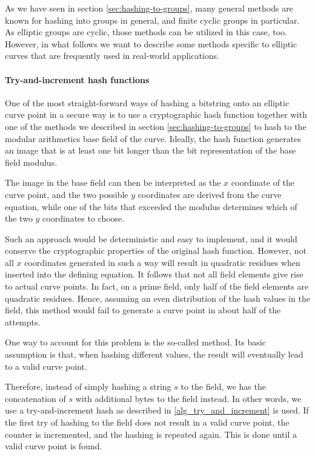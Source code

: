 As we have seen in section \ref{sec:hashing-to-groups}, many general methods are known for hashing into groups in general, and finite cyclic groups in particular. As elliptic groups are cyclic, those methods can be utilized in this case, too. However, in what follows we want to describe some methods specific to elliptic curves that are frequently used in real-world applications. 

\paragraph{Try-and-increment hash functions}
One of the most straight-forward ways of hashing a bitstring onto an elliptic curve point in a  secure way is to use a cryptographic hash function together with one of the methods we described in section \ref{sec:hashing-to-groups} to hash to the modular arithmetics base field of the curve. Ideally, the hash function generates an image that is at least one bit longer than the bit representation of the base field modulus.

The image in the base field can then be interpreted as the $x$ coordinate of the curve point, and the two possible $y$ coordinates are derived from the curve equation, while one of the bits that exceeded the modulus determines which of the two $y$ coordinates to choose.

Such an approach would be deterministic and easy to implement, and it would conserve the cryptographic properties of the original hash function. However, not all $x$ coordinates generated in such a way will result in quadratic residues when inserted into the defining equation. It follows that not all field elements give rise to actual curve points. In fact,
on a prime field, only half of the field elements are quadratic residues. Hence, assuming an even distribution of the hash values in the field, this method would fail to generate a curve point in about half of the attempts. 

One way to account for this problem is the so-called  method. Its basic assumption is that, when hashing different values, the result will eventually lead to a valid curve point. 

Therefore, instead of simply hashing a string $s$ to the field, we has the concatenation of $s$ with additional bytes to the field instead. In other words, we use a try-and-increment hash as described in \ref{alg_try_and_increment} is used. If the first try of hashing to the field does not result in a valid curve point, the counter is incremented, and the hashing is repeated again. This is done until a valid curve point is found.

